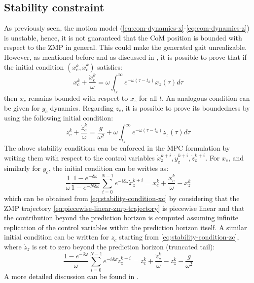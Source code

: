 \subsection{Stability constraint}
\label{sec:mpc-stability-constraint}
As previously seen, the motion model
(\ref{eq:com-dynamics-x}-\ref{eq:com-dynamics-z}) is unstable, hence, it is 
not guaranteed that the CoM position is bounded with respect to the ZMP in 
general. This could make the generated gait unrealizable. However, as mentioned 
before and as discussed in \cite{Lanari2014BoundednessII,
DBLP:conf/humanoids/SciancaCSLO16}, it is possible to prove that if the 
initial condition $(x_c^k, \dot{x}_c^k)$ satisfies:
\begin{equation}
  \label{eq:stability-condition-xc}
  x_c^k + \frac{\dot{x}_c^k}{\omega} = \omega \int_{t_k}^\infty 
      e^{-\omega(\tau-t_k)}x_z(\tau)d\tau
\end{equation}
then $x_c$ remains bounded with respect to $x_z$ for
all $t$. An analogous condition can be given for $y_c$ dynamics.
Regarding $z_c$, it is possible to prove its boundedness by using the following
initial condition:
\begin{equation}
  \label{eq:stability-condition-zc}
  z_c^k + \frac{\dot{z}_c^k}{\omega} = \frac{g}{\omega^2} +
      \omega \int_{t_k}^\infty e^{-\omega(\tau-t_k)}z_z(\tau)d\tau
\end{equation}
The above stability conditions can be enforced in the MPC formulation by 
writing them with respect to the control variables $\dot{x}_\text{z}^{k+i},
\dot{y}_\text{z}^{k+i}, \dot{z}_\text{z}^{k+i}$. For $x_c$,
and similarly for $y_c$, the initial condition can be 
writtes as:
\begin{equation}
  \label{eq:stability-constraint-xdot}
  \frac{1}{\omega}\frac{1-e^{-\delta\omega}}{1-e^{-N\delta\omega}}
    \sum_{i=0}^{N-1} e^{-i\delta\omega} \dot{x}_z^{k+i} =
    x_c^k + \frac{\dot{x}_c^k}{\omega} - x_z^k
\end{equation}
which can be obtained from \eqref{eq:stability-condition-xc} by considering 
that the ZMP trajectory \eqref{eq:piecewise-linear-zmp-trajectory} is piecewise 
linear and that the contribution beyond the prediction horizon is computed 
assuming infinite replication of the control variables within the prediction 
horizon itself. A similar initial condition can be written for $z_c$
starting from \eqref{eq:stability-condition-zc}, where $\dot{z}_z$ is set to zero 
beyond the prediction horizon (truncated tail):
\begin{equation}
  \label{eq:stability-constraint-zdot}
  \frac{1-e^{-\delta\omega}}{\omega}
    \sum_{i=0}^{N-1} e^{-i\delta\omega} \dot{z}_z^{k+i} =
    z_c^k + \frac{\dot{z}_c^k}{\omega} - z_z^k - \frac{g}{\omega^2}
\end{equation}
A more detailed discussion can be found in
\cite{DBLP:journals/corr/abs-1901-08505}.

